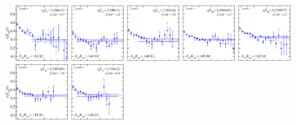 \begin{figure}[H]
    \includegraphics[width=0.215\textwidth]{figures/sigmas/g1u/fits/fit_10.pdf}
    \includegraphics[width=0.18\textwidth]{figures/sigmas/g1u/fits/fit_0.pdf}
    \includegraphics[width=0.18\textwidth]{figures/sigmas/g1u/fits/fit_2.pdf}
    \includegraphics[width=0.18\textwidth]{figures/sigmas/g1u/fits/fit_1.pdf}
    \includegraphics[width=0.18\textwidth]{figures/sigmas/g1u/fits/fit_5.pdf}\\
    \includegraphics[width=0.215\textwidth]{figures/sigmas/g1u/fits/fit_3.pdf}
    \includegraphics[width=0.18\textwidth]{figures/sigmas/g1u/fits/fit_4.pdf}

\end{figure}
